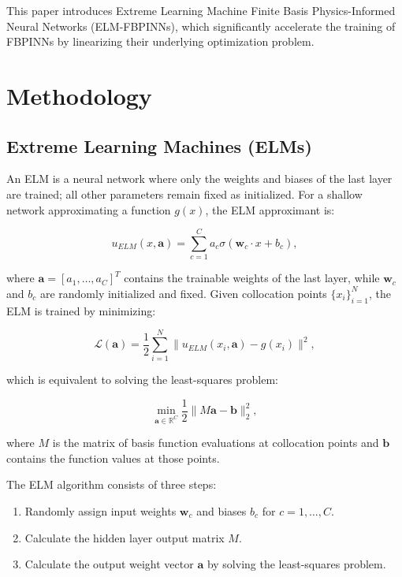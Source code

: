 \documentclass[11pt]{article}
\begin{document}
This paper introduces Extreme Learning Machine Finite Basis Physics-Informed Neural Networks (ELM-FBPINNs), which significantly accelerate the training of FBPINNs by linearizing their underlying optimization problem.

\section{Methodology}

\subsection{Extreme Learning Machines (ELMs)}

An ELM is a neural network where only the weights and biases of the last layer are trained; all other parameters remain fixed as initialized. For a shallow network approximating a function $g(x)$, the ELM approximant is:

\begin{equation}
    u_{ELM}(x,\mathbf{a}) = \sum_{c=1}^{C} a_c \sigma(\mathbf{w}_c \cdot x + b_c),
\end{equation}

where $\mathbf{a} = [a_1, \ldots, a_C]^T$ contains the trainable weights of the last layer, while $\mathbf{w}_c$ and $b_c$ are randomly initialized and fixed. Given collocation points $\{x_i\}_{i=1}^N$, the ELM is trained by minimizing:

\begin{equation}
    \mathcal{L}(\mathbf{a}) = \frac{1}{2} \sum_{i=1}^{N} \|u_{ELM}(x_i,\mathbf{a}) - g(x_i)\|^2,
\end{equation}

which is equivalent to solving the least-squares problem:

\begin{equation}
    \min_{\mathbf{a} \in \mathbb{R}^C} \frac{1}{2} \|M\mathbf{a} - \mathbf{b}\|_2^2,
\end{equation}

where $M$ is the matrix of basis function evaluations at collocation points and $\mathbf{b}$ contains the function values at those points.

The ELM algorithm consists of three steps:
\begin{enumerate}
    \item Randomly assign input weights $\mathbf{w}_c$ and biases $b_c$ for $c=1,\ldots,C$.
    \item Calculate the hidden layer output matrix $M$.
    \item Calculate the output weight vector $\mathbf{a}$ by solving the least-squares problem.
\end{enumerate}
\end{document}
